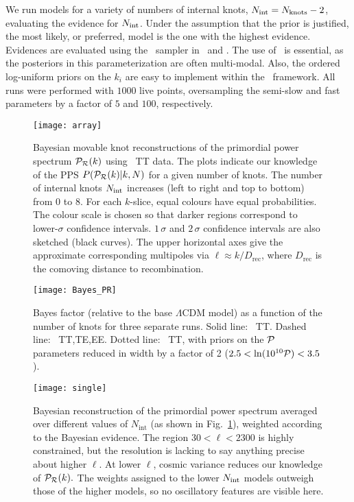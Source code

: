 We run models for a variety of numbers of internal knots, $N_\mathrm{int} =N_\mathrm{knots} -2$, evaluating the evidence for $N_\mathrm{int}$.
Under the assumption that the prior is justified, the most likely, or preferred, model is the one with the highest
evidence.  Evidences are evaluated using the \PolyChord\ sampler \citep{Polycord} 
in \CAMB\ and \CosmoMC. The use of \PolyChord\ is
essential, as the posteriors in this parameterization are often multi-modal. Also, the ordered log-uniform priors on
the $k_i$ are easy to implement within the \PolyChord\ framework. All runs were performed with $1000$ live points, 
oversampling the semi-slow and fast parameters by a factor of $5$ and $100$, respectively.

\begin{figure}
  \texttt{[image: array]}
\caption{Bayesian movable knot reconstructions of the primordial power spectrum $\mathcal{P}_\mathcal{R}(k)$ using \Planck\ TT data.
The plots indicate our knowledge of the PPS $P(\mathcal{P}_\mathcal{R}(k)|k,N)$ for a given number of knots.
The number of internal knots $N_\mathrm{int}$ increases (left to right and top to bottom) from $0$ to $8$.
For each $k$-slice, equal colours have equal probabilities. The colour scale is chosen so that darker regions
correspond to lower-$\sigma$ confidence intervals.
$1\,\sigma $ and $2\,\sigma $ confidence intervals are also sketched (black curves).
The upper horizontal axes give the approximate corresponding multipoles via $\ell \approx k/D_\mathrm{rec}$,
where $D_\mathrm{rec}$ is the comoving distance to recombination.
    \label{fig:Pkr0}}
\end{figure}


\begin{figure}
\texttt{[image: Bayes\_PR]}
  \caption{
    Bayes factor (relative to the base $\Lambda$CDM model) as a function of the number of knots
for three separate runs. Solid line: \Planck\ TT. Dashed line: \Planck\ TT,TE,EE. Dotted line:
\Planck\ TT, with priors on the $\mathcal{P}$ parameters reduced in width by a factor of 2 ($2.5<\ln(10^{10}\mathcal{P})<3.5$).
\label{fig:Bayes_Factors}
}
\end{figure}

\begin{figure}
\begin{center}
  \texttt{[image: single]}
\end{center}
\caption{
Bayesian reconstruction of the primordial power spectrum averaged over different values of $N_\mathrm{int}$
(as shown in Fig.~\protect\ref{fig:Pkr0}), weighted according to the Bayesian evidence.
The region ${30<\ell<2300}$ is highly constrained, but the resolution is lacking to say anything precise 
about higher $\ell$. At lower $\ell$, cosmic variance reduces our knowledge of $\mathcal{P}_\mathcal{R}(k).$
The weights assigned to the lower $N_\mathrm{int}$ models outweigh those of the higher models, so no oscillatory 
features are visible here.
\label{fig:full_bayes_knots}}
\end{figure}



